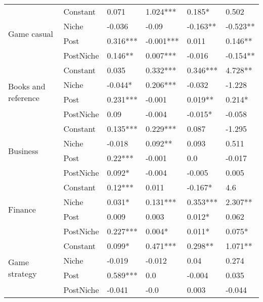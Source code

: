 \begin{longtable}[h!]{llllll}
\cline{1-6}
\multirow{4}{*}{Game casual} & Constant &               0.071 &    1.024*** &     0.185* &      0.502 \\
          & Niche &              -0.036 &       -0.09 &   -0.163** &   -0.523** \\
          & Post &            0.316*** &   -0.001*** &      0.011 &    0.146** \\
          & PostNiche &             0.146** &    0.007*** &     -0.016 &   -0.154** \\
\cline{1-6}
\multirow{4}{*}{Books and reference} & Constant &               0.035 &    0.332*** &   0.346*** &    4.728** \\
          & Niche &             -0.044* &    0.206*** &     -0.032 &     -1.228 \\
          & Post &            0.231*** &      -0.001 &    0.019** &     0.214* \\
          & PostNiche &                0.09 &      -0.004 &    -0.015* &     -0.058 \\
\cline{1-6}
\multirow{4}{*}{Business} & Constant &            0.135*** &    0.229*** &      0.087 &     -1.295 \\
          & Niche &              -0.018 &     0.092** &      0.093 &      0.511 \\
          & Post &             0.22*** &      -0.001 &        0.0 &     -0.017 \\
          & PostNiche &              0.092* &      -0.004 &     -0.005 &      0.005 \\
\cline{1-6}
\multirow{4}{*}{Finance} & Constant &             0.12*** &       0.011 &    -0.167* &        4.6 \\
          & Niche &              0.031* &    0.131*** &   0.353*** &    2.307** \\
          & Post &               0.009 &       0.003 &     0.012* &      0.062 \\
          & PostNiche &            0.227*** &      0.004* &     0.011* &     0.075* \\
\cline{1-6}
\multirow{4}{*}{Game strategy} & Constant &              0.099* &    0.471*** &    0.298** &    1.071** \\
          & Niche &              -0.019 &      -0.012 &       0.04 &      0.274 \\
          & Post &            0.589*** &         0.0 &     -0.004 &      0.035 \\
          & PostNiche &              -0.041 &        -0.0 &      0.003 &     -0.044 \\

\end{longtable}
